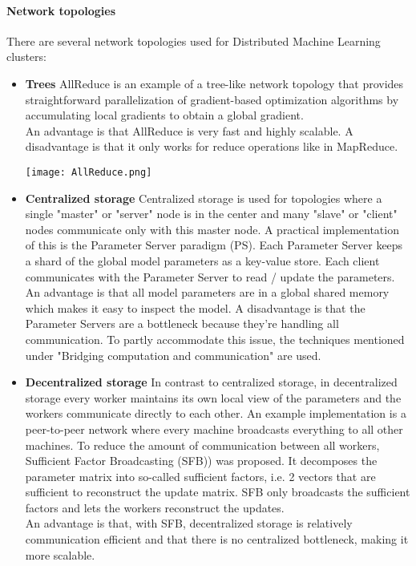 \paragraph{Network topologies}
There are several network topologies used for Distributed Machine Learning clusters:
\begin{itemize}
	\item \textbf{Trees} AllReduce\cite{Agar14} is an example of a tree-like network topology that provides straightforward parallelization of gradient-based optimization algorithms by accumulating local gradients to obtain a global gradient.\\
	An advantage is that AllReduce is very fast and highly scalable. A disadvantage is that it only works for reduce operations like in MapReduce.
	\begin{minipage}{\linewidth}
		\centering
		\texttt{[image: AllReduce.png]}
	\end{minipage}
	\item \textbf{Centralized storage} Centralized storage is used for topologies where a single "master" or "server" node is in the center and many "slave" or "client" nodes communicate only with this master node. A practical implementation of this is the Parameter Server paradigm (PS). Each Parameter Server keeps a shard of the global model parameters as a key-value store. Each client communicates with the Parameter Server to read / update the parameters. \\
	An advantage is that all model parameters are in a global shared memory which makes it easy to inspect the model. A disadvantage is that the Parameter Servers are a bottleneck because they're handling all communication. To partly accommodate this issue, the techniques mentioned under "Bridging computation and communication" are used.
	\item \textbf{Decentralized storage} In contrast to centralized storage, in decentralized storage every worker maintains its own local view of the parameters and the workers communicate directly to each other. An example implementation is a peer-to-peer network where every machine broadcasts everything to all other machines. To reduce the amount of communication between all workers, Sufficient Factor Broadcasting (SFB)\cite{Li13}) was proposed. It decomposes the parameter matrix into so-called sufficient factors, i.e. 2 vectors that are sufficient to reconstruct the update matrix. SFB only broadcasts the sufficient factors and lets the workers reconstruct the updates.\\
	An advantage is that, with SFB, decentralized storage is relatively communication efficient and that there is no centralized bottleneck, making it more scalable.
\end{itemize}










